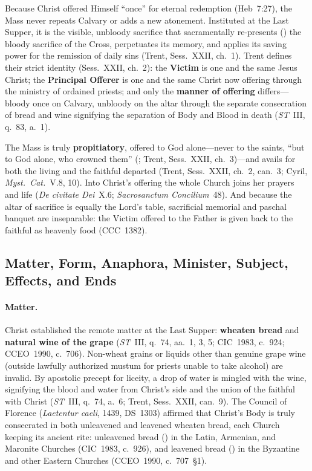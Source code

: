Because Christ offered Himself ``once'' for eternal redemption (Heb~7:27), the Mass never repeats Calvary or adds a new atonement. Instituted at the Last Supper, it is the visible, unbloody sacrifice that sacramentally re-presents () the bloody sacrifice of the Cross, perpetuates its memory, and applies its saving power for the remission of daily sins (Trent, Sess.~XXII, ch.~1). Trent defines their strict identity (Sess.~XXII, ch.~2): the \textbf{Victim} is one and the same Jesus Christ; the \textbf{Principal Offerer} is one and the same Christ now offering through the ministry of ordained priests; and only the \textbf{manner of offering} differs---bloody once on Calvary, unbloody on the altar through the separate consecration of bread and wine signifying the separation of Body and Blood in death (\emph{ST}~III, q.~83, a.~1).

The Mass is truly \textbf{propitiatory}, offered to God alone---never to the saints, ``but to God alone, who crowned them'' (; Trent, Sess.~XXII, ch.~3)---and avails for both the living and the faithful departed (Trent, Sess.~XXII, ch.~2, can.~3; Cyril, \emph{Myst.~Cat.}~V.8, 10). Into Christ's offering the whole Church joins her prayers and life (\emph{De civitate Dei}~X.6; \emph{Sacrosanctum Concilium}~48). And because the altar of sacrifice is equally the Lord's table, sacrificial memorial and paschal banquet are inseparable: the Victim offered to the Father is given back to the faithful as heavenly food (CCC~1382).

\subsection{Matter, Form, Anaphora, Minister, Subject, Effects, and Ends}
\label{subsec:eucharist-constitution}

\paragraph{Matter.}
Christ established the remote matter at the Last Supper: \textbf{wheaten bread} and \textbf{natural wine of the grape} (\emph{ST}~III, q.~74, aa.~1, 3, 5; CIC~1983, c.~924; CCEO~1990, c.~706). Non-wheat grains or liquids other than genuine grape wine (outside lawfully authorized mustum for priests unable to take alcohol) are invalid. By apostolic precept for liceity, a drop of water is mingled with the wine, signifying the blood and water from Christ's side and the union of the faithful with Christ (\emph{ST}~III, q.~74, a.~6; Trent, Sess.~XXII, can.~9). The Council of Florence (\emph{Laetentur caeli}, 1439, DS~1303) affirmed that Christ's Body is truly consecrated in both unleavened and leavened wheaten bread, each Church keeping its ancient rite: unleavened bread () in the Latin, Armenian, and Maronite Churches (CIC~1983, c.~926), and leavened bread () in the Byzantine and other Eastern Churches (CCEO~1990, c.~707~\S1).

